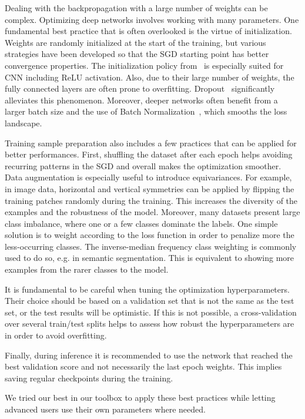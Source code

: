 \documentclass[journal]{IEEEtran}
\begin{document}
Dealing with the backpropagation with a large number of weights can be complex. Optimizing deep networks involves working with many parameters. One fundamental best practice that is often overlooked is the virtue of initialization. Weights are randomly initialized at the start of the training, but various strategies have been developed so that the SGD starting point has better convergence properties. The initialization policy from~\cite{he_delving_2015} is especially suited for CNN including ReLU activation. Also, due to their large number of weights, the fully connected layers are often prone to overfitting. Dropout~\cite{srivastava_dropout:_2014} significantly alleviates this phenomenon. Moreover, deeper networks often benefit from a larger batch size and the use of Batch Normalization~\cite{ioffe_batch_2015}, which smooths the loss landscape.

Training sample preparation also includes a few practices that can be applied for better performances. First, shuffling the dataset after each epoch helps avoiding recurring patterns in the SGD and overall makes the optimization smoother. Data augmentation is especially useful to introduce equivariances. For example, in image data, horizontal and vertical symmetries can be applied by flipping the training patches randomly during the training. This increases the diversity of the examples and the robustness of the model. Moreover, many datasets present large class imbalance, where one or a few classes dominate the labels. One simple solution is to weight according to the loss function in order to penalize more the less-occurring classes. The inverse-median frequency class weighting is commonly used  to do so, e.g. in semantic segmentation. This is equivalent to showing more examples from the rarer classes to the model.

It is fundamental to be careful when tuning the optimization hyperparameters. Their choice should be based on a validation set that is not the same as the test set, or the test results will be optimistic. If this is not possible, a cross-validation over several train/test splits helps to assess how robust the hyperparameters are in order to avoid overfitting.

Finally, during inference it is recommended to use the network that reached the best validation score and not necessarily the last epoch weights. This implies saving regular checkpoints during the training.

We tried our best in our toolbox to apply these best practices while letting advanced users use their own parameters where needed.
\end{document}
